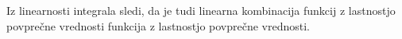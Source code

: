 \documentclass[mat1]{fmfdelo}
\begin{document}
    \begin{opomba}
        \label{linlpv}
        Iz linearnosti integrala sledi, da je tudi linearna kombinacija funkcij z lastnostjo povprečne vrednosti funkcija z lastnostjo povprečne vrednosti. 
    \end{opomba}

\end{document}
